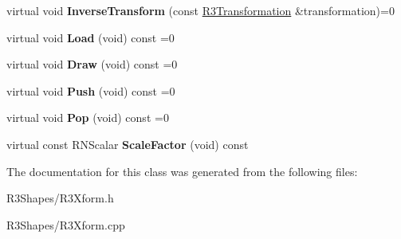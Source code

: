 \begin{DoxyCompactItemize}
\item 
virtual void {\bfseries Inverse\+Transform} (const \hyperlink{class_r3_transformation}{R3\+Transformation} \&transformation)=0\hypertarget{class_r3_transformation_aaf8083034538d0c617b0f2f4a47cffd3}{}\label{class_r3_transformation_aaf8083034538d0c617b0f2f4a47cffd3}

\item 
virtual void {\bfseries Load} (void) const  =0\hypertarget{class_r3_transformation_a3d8367c81ba92b5a03c5e76323394790}{}\label{class_r3_transformation_a3d8367c81ba92b5a03c5e76323394790}

\item 
virtual void {\bfseries Draw} (void) const  =0\hypertarget{class_r3_transformation_a87bc7bb94a7b45041afbb3c245db3ed6}{}\label{class_r3_transformation_a87bc7bb94a7b45041afbb3c245db3ed6}

\item 
virtual void {\bfseries Push} (void) const  =0\hypertarget{class_r3_transformation_a12ebcb9129ffa19656406e5f21fcc2d7}{}\label{class_r3_transformation_a12ebcb9129ffa19656406e5f21fcc2d7}

\item 
virtual void {\bfseries Pop} (void) const  =0\hypertarget{class_r3_transformation_a65b18be6557b417d31c7e859499c82f0}{}\label{class_r3_transformation_a65b18be6557b417d31c7e859499c82f0}

\item 
virtual const R\+N\+Scalar {\bfseries Scale\+Factor} (void) const \hypertarget{class_r3_transformation_adb79cd60f0e893cde9f09a3e31c816cd}{}\label{class_r3_transformation_adb79cd60f0e893cde9f09a3e31c816cd}

\end{DoxyCompactItemize}


The documentation for this class was generated from the following files\+:\begin{DoxyCompactItemize}
\item 
R3\+Shapes/R3\+Xform.\+h\item 
R3\+Shapes/R3\+Xform.\+cpp\end{DoxyCompactItemize}

